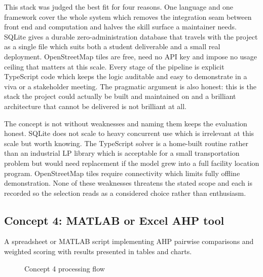 \documentclass[12pt,a4paper]{report}
\begin{document}
This stack was judged the best fit for four reasons. One language and
one framework cover the whole system which removes the integration
seam between front end and computation and halves the skill surface a
maintainer needs. SQLite gives a durable zero-administration database
that travels with the project as a single file which suits both a
student deliverable and a small real deployment. OpenStreetMap tiles
are free, need no API key and impose no usage ceiling that matters at
this scale. Every stage of the pipeline is explicit TypeScript code
which keeps the logic auditable and easy to demonstrate in a viva or
a stakeholder meeting. The pragmatic argument is also honest: this is
the stack the project could actually be built and maintained on and
a brilliant architecture that cannot be delivered is not brilliant at
all.

The concept is not without weaknesses and naming them keeps the
evaluation honest. SQLite does not scale to heavy concurrent use which
is irrelevant at this scale but worth knowing. The TypeScript solver
is a home-built routine rather than an industrial LP library which is
acceptable for a small transportation problem but would need
replacement if the model grew into a full facility location program.
OpenStreetMap tiles require connectivity which limits fully offline
demonstration. None of these weaknesses threatens the stated scope and
each is recorded so the selection reads as a considered choice rather
than enthusiasm.

\subsection{Concept 4: MATLAB or Excel AHP tool}
A spreadsheet or MATLAB script implementing AHP pairwise comparisons
and weighted scoring with results presented in tables and charts.

\begin{figure}[h]
\centering
{}
\caption{Concept 4 processing flow}
\end{figure}
\end{document}
